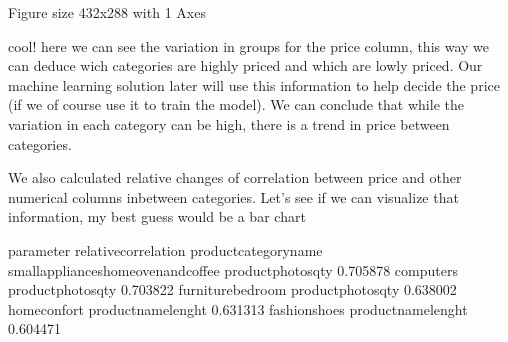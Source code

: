 \documentclass[letterpaper,10pt,english]{jupyterBook}
\begin{document}
\begin{sphinxVerbatim}[commandchars=\\\{\}]
\PYGZlt{}Figure size 432x288 with 1 Axes\PYGZgt{}
\end{sphinxVerbatim}

\sphinxAtStartPar
cool! here we can see the variation in groups for the price column, this way we can deduce wich categories are highly priced and which are lowly priced. Our machine learning solution later will use this information to help decide the price (if we of course use it to train the model). We can conclude that while the variation in each category can be high, there is a trend in price between categories.

\sphinxAtStartPar
We also calculated relative changes of correlation between price and other numerical columns inbetween categories. Let’s see if we can visualize that information, my best guess would be a bar chart

\begin{sphinxVerbatim}[commandchars=\\\{\}]
\end{sphinxVerbatim}

\begin{sphinxVerbatim}[commandchars=\\\{\}]
                                                 parameter  relative\PYGZus{}correlation
product\PYGZus{}category\PYGZus{}name                                                           
small\PYGZus{}appliances\PYGZus{}home\PYGZus{}oven\PYGZus{}and\PYGZus{}coffee   product\PYGZus{}photos\PYGZus{}qty              0.705878
computers                               product\PYGZus{}photos\PYGZus{}qty              0.703822
furniture\PYGZus{}bedroom                       product\PYGZus{}photos\PYGZus{}qty              0.638002
home\PYGZus{}confort                           product\PYGZus{}name\PYGZus{}lenght              0.631313
fashion\PYGZus{}shoes                          product\PYGZus{}name\PYGZus{}lenght              0.604471
\end{sphinxVerbatim}
\end{document}

